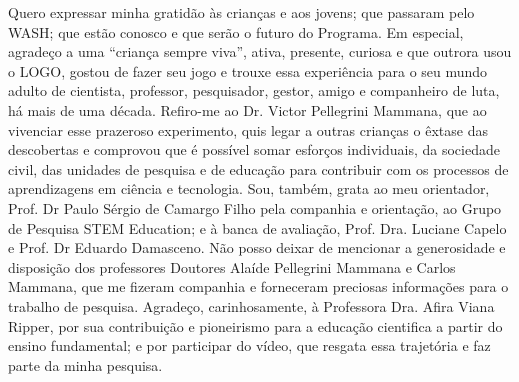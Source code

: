 
\begin{agradecimentos}%

Quero expressar minha gratidão às crianças e aos jovens; que passaram pelo WASH; que estão conosco e que serão o futuro do Programa.
Em especial, agradeço a uma “criança sempre viva”, ativa, presente, curiosa e que outrora usou o LOGO, gostou de fazer seu jogo e trouxe essa experiência para o seu mundo adulto de cientista, professor, pesquisador, gestor, amigo e companheiro de luta, há mais de uma década. Refiro-me ao Dr. Victor Pellegrini Mammana, que ao vivenciar esse prazeroso experimento, quis legar a outras crianças o êxtase das descobertas e comprovou que é possível somar esforços individuais, da sociedade civil, das unidades de pesquisa e de educação para contribuir com os processos de aprendizagens em ciência e tecnologia.
Sou, também, grata ao meu orientador, Prof. Dr Paulo Sérgio de Camargo Filho pela companhia e orientação, ao Grupo de Pesquisa STEM Education; e à banca de avaliação, Prof. Dra. Luciane Capelo e Prof. Dr Eduardo Damasceno.
Não posso deixar de mencionar a generosidade e disposição dos professores Doutores Alaíde Pellegrini Mammana e Carlos Mammana, que me fizeram companhia e forneceram preciosas informações para o trabalho de pesquisa.
Agradeço, carinhosamente, à Professora Dra. Afira Viana Ripper, por sua contribuição e pioneirismo para a educação cientifica a partir do ensino fundamental; e por participar do vídeo, que resgata essa trajetória e faz parte da minha pesquisa.

\end{agradecimentos}
